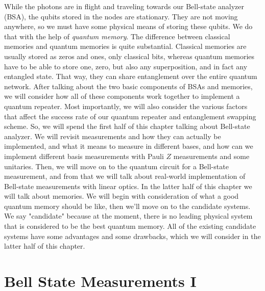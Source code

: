 While the photons are in flight and traveling towards our Bell-state analyzer (BSA), the qubits stored in the nodes are stationary. They are not moving anywhere, so we must have some physical means of storing these qubits. We do that with the help of \emph{quantum memory}. The difference between classical memories and quantum memories is quite substantial. Classical memories are usually stored as zeros and ones, only classical bits, whereas quantum memories have to be able to store one, zero, but also any superposition, and in fact any entangled state. That way, they can share entanglement over the entire quantum network. After talking about the two basic components of BSAs and memories, we will consider how all of these components work together to implement a quantum repeater. Most importantly, we will also consider the various factors that affect the success rate of our quantum repeater and entanglement swapping scheme. So, we will spend the first half of this chapter talking about Bell-state analyzer. We will revisit measurements and how they can actually be implemented, and what it means to measure in different bases, and how can we implement different basis measurements with Pauli $Z$ measurements and some unitaries. Then, we will move on to the quantum circuit for a Bell-state measurement, and from that we will talk about real-world implementation of Bell-state measurements with linear optics.  In the latter half of this chapter we will talk about memories. We will begin with consideration of what a good quantum memory should be like, then we'll move on to the candidate systems.  We say "candidate" because at the moment, there is no leading physical system that is considered to be the best quantum memory. All of the existing candidate systems have some advantages and some drawbacks, which we will consider in the latter half of this chapter.



\section{Bell State Measurements I}

